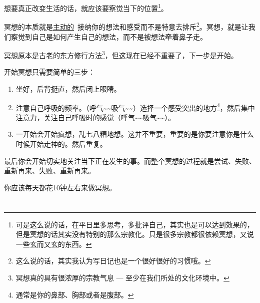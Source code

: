 \documentclass[b5paper]{ctexart}
\begin{document}
			想要真正改变生活的话，就应该要察觉当下的位置\footnote{可是这么说的话，在平日里多思考，多批评自己，其实也是可以达到效果的，但是冥想的话其实没有特别的那么宗教化。只是很多宗教都很依赖冥想，又说一些玄而又玄的东西。}。

			冥想的本质就是\underline{主动的}~\!接纳你的想法和感受而不是特意去排斥\footnote{这么说的话，其实我认为写日记也是一个很好很好的习惯哦。}。冥想，就是让我们察觉到自己是如何产生自己的想法，而不是被想法牵着鼻子走。

			冥想原本是古老的东方修行方法\footnote{冥想真的具有很浓厚的宗教气息 --- 至少在我们所处的文化环境中。}，但这现在已经不重要了，下一步是开始。

			开始冥想只需要简单的三步：
			\begin{enumerate}
				\item 坐好，后背挺直，然后闭上眼睛。
				\item 注意自己呼吸的频率。（呼气\~{}\~{}吸气\~{}\~{}）选择一个感受突出的地方\footnote{通常是你的鼻部、胸部或者是腹部。}，然后集中注意力，关注自己呼吸时的感觉（呼气\~{}\~{}吸气\~{}\~{}）。
				\item 一开始会开始疯想，乱七八糟地想。这并不重要，重要的是你要注意你是什么时候开始走神的。然后重复。
			\end{enumerate}

			最后你会开始切实地关注当下正在发生的事。而整个冥想的过程就是尝试、失败、重新再来、失败、重新再来。
			
			你应该每天都花10钟左右来做冥想。

		\section{}
    
\end{document}
